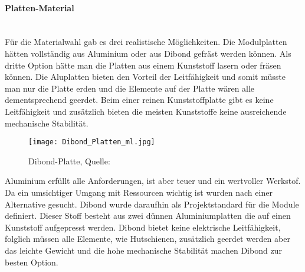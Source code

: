    \paragraph{Platten-Material}\mbox{}\\
    Für die Materialwahl gab es drei realistische Möglichkeiten. Die Modulplatten hätten vollständig aus Aluminium oder aus Dibond gefräst werden können. Als dritte Option hätte man die Platten aus einem Kunststoff lasern oder fräsen können. Die Aluplatten bieten den Vorteil der Leitfähigkeit und somit müsste man nur die Platte erden und die Elemente auf der Platte wären alle dementsprechend geerdet. Beim einer reinen Kunststoffplatte gibt es keine Leitfähigkeit und zusätzlich bieten die meisten Kunststoffe keine ausreichende mechanische Stabilität.\\
    \begin{figure}[h]
        \centering
        \texttt{[image: Dibond\_Platten\_ml.jpg]}
        \caption{Dibond-Platte, Quelle: \cite{Dibond-Platte}}
        \label{fig:Sommerprototyp}
    \end{figure}
    Aluminium erfüllt alle Anforderungen, ist aber teuer und ein wertvoller Werkstof. Da ein umsichtiger Umgang mit Ressourcen wichtig ist wurden nach einer Alternative gesucht. Dibond wurde daraufhin als Projektstandard für die Module definiert. Dieser Stoff besteht aus zwei dünnen Aluminiumplatten die auf einen Kunststoff aufgepresst werden. Dibond bietet keine elektrische Leitfähigkeit, folglich müssen alle Elemente, wie Hutschienen, zusätzlich geerdet werden aber das leichte Gewicht und die hohe mechanische Stabilität machen Dibond zur besten Option.

